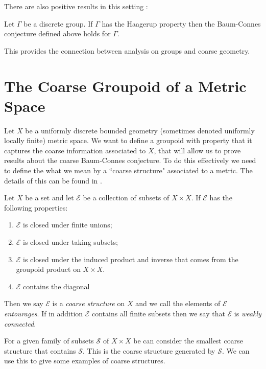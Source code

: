 There are also positive results in this setting \cite{MR1487204}:

\begin{theorem}
Let $\Gamma$ be a discrete group. If $\Gamma$ has the Haagerup property then the Baum-Connes conjecture defined above holds for $\Gamma$.
\end{theorem}

This provides the connection between analysis on groups and coarse geometry.

\section{The Coarse Groupoid of a Metric Space}\label{Sect:CG}

Let $X$ be a uniformly discrete bounded geometry (sometimes denoted uniformly locally finite) metric space. We want to define a groupoid with property that it captures the coarse information associated to $X$, that will allow us to prove results about the coarse Baum-Connes conjecture. To do this effectively we need to define the what we mean by a ``coarse structure" associated to a metric. The details of this can be found in \cite{MR2007488}.

\begin{definition}
Let $X$ be a set and let $\mathcal{E}$ be a collection of subsets of $X \times X$. If $\mathcal{E}$ has the following properties:
\begin{enumerate}
\item $\mathcal{E}$ is closed under finite unions;
\item $\mathcal{E}$ is closed under taking subsets;
\item $\mathcal{E}$ is closed under the induced product and inverse that comes from the groupoid product on $X \times X$.
\item $\mathcal{E}$ contains the diagonal
\end{enumerate}
Then we say $\mathcal{E}$ is a \textit{coarse structure} on $X$ and we call the elements of $\mathcal{E}$ \textit{entourages}. If in addition $\mathcal{E}$ contains all finite subsets then we say that $\mathcal{E}$ is \textit{weakly connected}.
\end{definition}

For a given family of subsets $\mathcal{S}$ of $X \times X$ be can consider the smallest coarse structure that contains $\mathcal{S}$. This is the coarse structure generated by $\mathcal{S}$. We can use this to give some examples of coarse structures.

